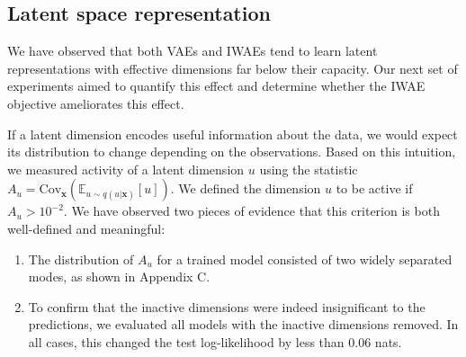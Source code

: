 \documentclass{article} %
\newcommand{\expect}{\mathbb{E}}
\newcommand{\obs}{\mathbf{x}}
\newcommand{\pmfGen}{p}
\newcommand{\pmfRec}{q}
\newcommand{\latentUnit}{u}
\newcommand{\latentUnits}{\vec{u}}
\begin{document}
\subsection{Latent space representation}
\label{sec:latent}

We have observed that both VAEs and IWAEs tend to learn latent representations with effective dimensions far below their capacity. Our next set of experiments aimed to quantify this effect and determine whether the IWAE objective ameliorates this effect. 




If a latent dimension encodes useful information about the data, we would expect its distribution to change depending on the observations. Based on this intuition, we measured activity of a latent dimension $\latentUnit$ using the statistic $A_\latentUnit = \mathrm{Cov}_{\obs} \left( \expect_{\latentUnit \sim \pmfRec(\latentUnit | \obs)} [\latentUnit] \right)$. We defined the dimension $\latentUnit$ to be active if $A_\latentUnit > 10^{-2}$. We have observed two pieces of evidence that this criterion is both well-defined and meaningful:
\begin{enumerate}
\item The distribution of $A_\latentUnit$ for a trained model consisted of two widely separated modes, as shown in Appendix C.
\item To confirm that the inactive dimensions were indeed insignificant to the predictions, we evaluated all models with the inactive dimensions removed. In all cases, this changed the test log-likelihood by less than $0.06$ nats.
\end{enumerate}
\end{document}
